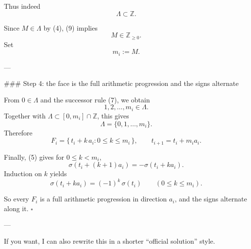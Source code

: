 Thus indeed
\[
\Lambda\subset\mathbb{Z}.
\tag{9}
\]

Since \(M\in\Lambda\) by (4), (9) implies
\[
M\in\mathbb{Z}_{\ge 0}.
\]
Set
\[
m_i:=M.
\]

---

### Step 4: the face is the full arithmetic progression and the signs alternate

From \(0\in\Lambda\) and the successor rule (7), we obtain
\[
1,2,\dots,m_i\in\Lambda.
\]
Together with \(\Lambda\subset[0,m_i]\cap\mathbb{Z}\), this gives
\[
\Lambda=\{0,1,\dots,m_i\}.
\]
Therefore
\[
F_i=\{\,t_i+k\,a_i:0\le k\le m_i\,\},
\qquad
t_{i+1}=t_i+m_i a_i.
\]

Finally, (5) gives for \(0\le k<m_i\),
\[
\sigma(t_i+(k+1)a_i)=-\sigma(t_i+k a_i).
\]
Induction on \(k\) yields
\[
\sigma(t_i+k a_i)=(-1)^k\,\sigma(t_i)
\qquad(0\le k\le m_i).
\]

So every \(F_i\) is a full arithmetic progression in direction \(a_i\), and the signs alternate along it. \(\square\)

---

If you want, I can also rewrite this in a shorter “official solution” style.